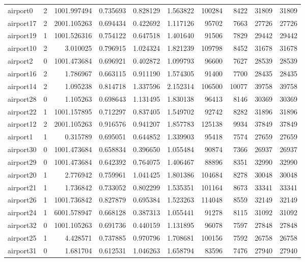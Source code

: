 \begin{longtable}{|l|r|r|r|r|r|r|r|r|r|}
airport0 & 2 & 1001.997494 & 0.735693 & 0.828129 & 1.563822 & 100284 & 8422 & 31809 & 31809 \\
airport17 & 2 & 2001.105263 & 0.694434 & 0.422692 & 1.117126 & 95702 & 7663 & 27726 & 27726 \\
airport19 & 1 & 1001.526316 & 0.754122 & 0.647518 & 1.401640 & 91506 & 7829 & 29442 & 29442 \\
airport10 & 2 & 3.010025 & 0.796915 & 1.024324 & 1.821239 & 109798 & 8452 & 31678 & 31678 \\
airport2 & 0 & 1001.473684 & 0.696921 & 0.402872 & 1.099793 & 96600 & 7627 & 28539 & 28539 \\
airport16 & 2 & 1.786967 & 0.663115 & 0.911190 & 1.574305 & 91400 & 7700 & 28435 & 28435 \\
airport14 & 2 & 1.095238 & 0.814718 & 1.337596 & 2.152314 & 106500 & 10077 & 39758 & 39758 \\
airport28 & 0 & 1.105263 & 0.698643 & 1.131495 & 1.830138 & 96413 & 8146 & 30369 & 30369 \\
airport22 & 1 & 1001.157895 & 0.712297 & 0.837405 & 1.549702 & 92742 & 8282 & 31896 & 31896 \\
airport12 & 2 & 2001.105263 & 0.916576 & 0.941207 & 1.857783 & 125138 & 9934 & 37849 & 37849 \\
airport1 & 1 & 0.315789 & 0.695051 & 0.644852 & 1.339903 & 95418 & 7574 & 27659 & 27659 \\
airport30 & 0 & 1001.473684 & 0.658834 & 0.396650 & 1.055484 & 90874 & 7366 & 26937 & 26937 \\
airport29 & 0 & 1001.473684 & 0.642392 & 0.764075 & 1.406467 & 88896 & 8351 & 32990 & 32990 \\
airport20 & 1 & 2.776942 & 0.759961 & 1.041425 & 1.801386 & 104684 & 8278 & 30048 & 30048 \\
airport21 & 1 & 1.736842 & 0.733052 & 0.802299 & 1.535351 & 101164 & 8673 & 33341 & 33341 \\
airport26 & 1 & 1001.736842 & 0.827879 & 0.695384 & 1.523263 & 114048 & 8559 & 32149 & 32149 \\
airport24 & 1 & 6001.578947 & 0.668128 & 0.387313 & 1.055441 & 91278 & 8115 & 31092 & 31092 \\
airport32 & 0 & 1001.105263 & 0.691736 & 0.440159 & 1.131895 & 96078 & 7597 & 27848 & 27848 \\
airport25 & 1 & 4.428571 & 0.737885 & 0.970796 & 1.708681 & 100156 & 7592 & 26758 & 26758 \\
airport31 & 0 & 1.681704 & 0.612531 & 1.046263 & 1.658794 & 83596 & 7476 & 27940 & 27940 \\

\end{longtable}
